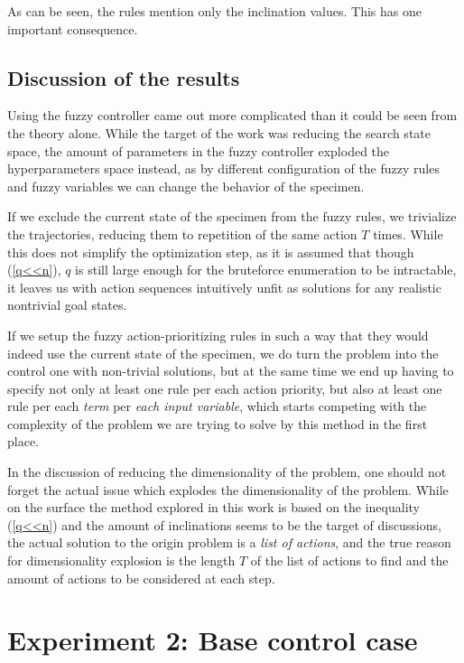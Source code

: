 \documentclass[12pt, a4paper]{article}
\begin{document}
	As can be seen, the rules mention only the inclination values.
	This has one important consequence.
	
	\subsection{Discussion of the results}
	
	Using the fuzzy controller came out more complicated than it could be seen from the theory alone.
	While the target of the work was reducing the search state space, the amount of parameters in the fuzzy controller exploded the hyperparameters space instead, as by different configuration of the fuzzy rules and fuzzy variables we can change the behavior of the specimen.
	
	If we exclude the current state of the specimen from the fuzzy rules, we trivialize the trajectories, reducing them to repetition of the same action $T$ times.
	While this does not simplify the optimization step, as it is assumed that though (\ref{q<<n}), $q$ is still large enough for the bruteforce enumeration to be intractable, it leaves us with action sequences intuitively unfit as solutions for any realistic nontrivial goal states.
	
	If we setup the fuzzy action-prioritizing rules in such a way that they would indeed use the current state of the specimen, we do turn the problem into the control one with non-trivial solutions, but at the same time we end up having to specify not only at least one rule per each action priority, but also at least one rule per each \textit{term} per \textit{each input variable}, which starts competing with the complexity of the problem we are trying to solve by this method in the first place.
	
	In the discussion of reducing the dimensionality of the problem, one should not forget the actual issue which explodes the dimensionality of the problem.
	While on the surface the method explored in this work is based on the inequality (\ref{q<<n}) and the amount of inclinations seems to be the target of discussions, the actual solution to the origin problem is a \textit{list of actions}, and the true reason for dimensionality explosion is the length $T$ of the list of actions to find and the amount of actions to be considered at each step.
	
	\section{Experiment 2: Base control case}
    
\end{document}
